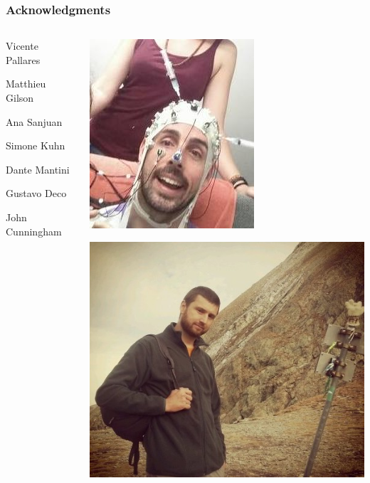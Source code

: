 \documentclass[final]{beamer}
\begin{document}
\begin{frame}
\frametitle{Acknowledgments}
\begin{columns}
\begin{column}{0.5\textwidth}
\begin{center}
	\alert<2>{Vicente Pallares}\\
\vspace{1cm}

\alert<2>{Matthieu Gilson}\\
\vspace{1cm}

\small Ana Sanjuan\\
\vspace{0.5cm}

\small Simone Kuhn\\
\vspace{0.5cm}

\small Dante Mantini\\
\vspace{0.5cm}

\small Gustavo Deco\\
\vspace{0.5cm}

\normalsize \alert<2>{John Cunningham}\\
\end{center}
\end{column}
\begin{column}{0.5\textwidth}
\includegraphics[width=0.5\columnwidth,valign=t]{vicente2}
\vspace{0.5cm}

\includegraphics[width=0.5\columnwidth,valign=t]{matt}
\end{column}
\end{columns}
\end{frame}
\end{document}
